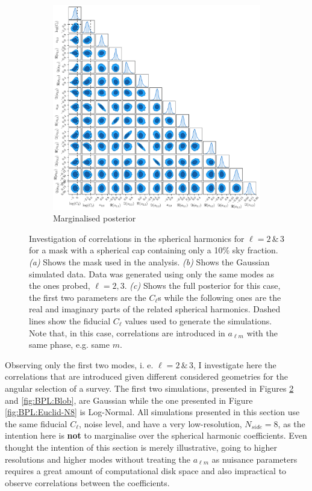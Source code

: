 \begin{figure}
\begin{subfigure}[b]{\textwidth}
 \includegraphics[width=\textwidth]{BPL-FIGS/RandomBand_fsky_01_trianglePlot.pdf}
  \caption{Marginalised posterior}
  \label{fig:BPL:PoleTri}
\end{subfigure}
\caption[Investigation of correlation spherical harmonics for $\ell = 2\, \& \, 3$ for a mask with a spherical cap containing only a 10\% sky fraction]{Investigation of correlations in the spherical harmonics for $\ell = 2\, \& \, 3$ for a mask with a spherical cap containing only a 10\% sky fraction. \textit{(a)} Shows the mask used in the analysis. \textit{(b)} Shows the Gaussian simulated data. Data was generated using only the same modes as the ones probed, $\ell = 2,3$. \textit{(c)} Shows the full posterior for this case, the first two parameters are the $C_{\ell}$s while the following ones are the real and imaginary parts of the related spherical harmonics. Dashed lines show the fiducial $C_{\ell}$ values used to generate the simulations. Note that, in this case, correlations are introduced in $a_{\ell m}$ with the same phase, e.g. same $m$.}
\label{fig:BPL:Pole}
\end{figure}

\qquad Observing only the first two modes, i. e. $\ell = 2 \, \& \, 3$, I investigate here the correlations that are introduced given different considered geometries for the angular selection of a survey. The first two simulations, presented in Figures \ref{fig:BPL:Pole} and \ref{fig:BPL:Blob}, are Gaussian while the one presented in Figure \ref{fig:BPL:Euclid-N8} is Log-Normal. All simulations presented in this section use the same fiducial $C_{\ell}$, noise level, and have a very low-resolution, $N_{side}=8$, as the intention here is \textbf{not} to marginalise over the spherical harmonic coefficients. Even thought the intention of this section is merely illustrative, going to higher resolutions and higher modes without treating the $a_{\ell m}$ as nuisance parameters requires a great amount of computational disk space and also impractical to observe correlations between the coefficients. 

